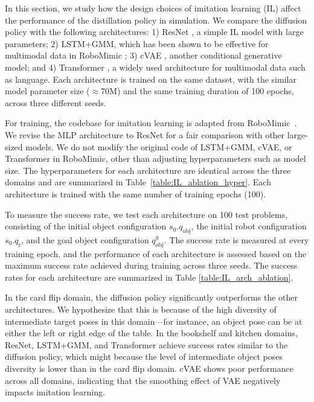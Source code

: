 In this section, we study how the design choices of imitation learning (IL) affect the performance of the distillation policy in simulation. We compare the diffusion policy \cite{chi2023diffusion} with the following architectures: 1) ResNet \cite{he2016deep}, a simple IL model with large parameters; 2) LSTM+GMM, which has been shown to be effective for multimodal data in RoboMimic \cite{robomimic2021}; 3) cVAE \cite{kingma2013auto}, another conditional generative model; and 4) Transformer \cite{vaswani2017attention}, a widely used architecture for multimodal data such as language. Each architecture is trained on the same dataset, with the similar model parameter size ($\approx$70M) and the same training duration of 100 epochs, across three different seeds. 

For training, the codebase for imitation learning is adapted from RoboMimic~\cite{robomimic2021}. We revise the MLP architecture to ResNet for a fair comparison with other large-sized models. We do not modify the original code of LSTM+GMM, cVAE, or Transformer in RoboMimic, other than adjusting hyperparameters such as model size. The hyperparameters for each architecture are identical across the three domains and are summarized in Table~\ref{table:IL_ablation_hyper}. Each architecture is trained with the same number of training epochs (100).




To measure the success rate, we test each architecture on 100 test problems, consisting of the initial object configuration $s_0.q_{\text{obj}}$, the initial robot configuration $s_0.q_{\text{r}}$, and the goal object configuration $q^g_{\text{obj}}$. The success rate is measured at every training epoch, and the performance of each architecture is assessed based on the maximum success rate achieved during training across three seeds. The success rates for each architecture are summarized in Table \ref{table:IL_arch_ablation}. 

In the card flip domain, the diffusion policy significantly outperforms the other architectures. We hypothesize that this is because of the high diversity of intermediate target poses in this domain—for instance, an object pose can be at either the left or right edge of the table. In the bookshelf and kitchen domains, ResNet, LSTM+GMM, and Transformer achieve success rates similar to the diffusion policy, which might because the level of intermediate object poses diversity is lower than in the card flip domain. cVAE shows poor performance across all domains, indicating that the smoothing effect of VAE negatively impacts imitation learning.

